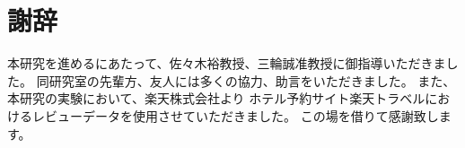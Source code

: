 \section*{謝辞}

本研究を進めるにあたって、佐々木裕教授、三輪誠准教授に御指導いただきました。
同研究室の先輩方、友人には多くの協力、助言をいただきました。
また、本研究の実験において、楽天株式会社より
ホテル予約サイト楽天トラベルにおけるレビューデータを使用させていただきました。
この場を借りて感謝致します。
